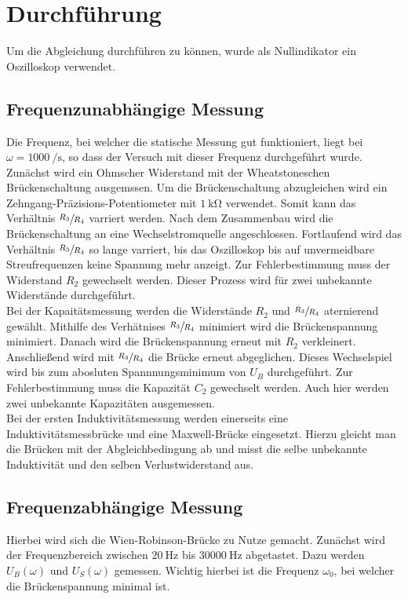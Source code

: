 \section{Durchführung}
\label{sec:Durchführung}
Um die Abgleichung durchführen zu können, wurde als Nullindikator ein Oszilloskop verwendet.
\subsection{Frequenzunabhängige Messung}
Die Frequenz, bei welcher die statische Messung gut funktioniert, liegt bei  $ \omega = \SI{1000}{\per\second}$, so dass der Versuch mit dieser Frequenz durchgeführt wurde.\\
Zunächst wird ein Ohmscher Widerstand mit der Wheatstoneschen Brückenschaltung ausgemssen. Um die Brückenschaltung abzugleichen wird ein 
Zehngang-Präzisions-Potentiometer  mit $\SI{1}{\kilo\ohm}$ verwendet. Somit kann das Verhältnis $\sfrac{R_3}{R_4}$ varriert werden.
Nach dem Zusammenbau wird die Brückenschaltung an eine Wechselstromquelle angeschlossen. Fortlaufend wird das Verhältnis 
$\sfrac{R_3}{R_4}$ so lange varriert, bis das Oszilloskop bis auf unvermeidbare 
Streufrequenzen keine Spannung mehr anzeigt. Zur Fehlerbestimmung muss der Widerstand $R_2$ gewechselt werden.
Dieser Prozess wird für zwei unbekannte Widerstände durchgeführt.\\
Bei der Kapaitätsmessung werden die Widerstände $R_2$ und $\sfrac{R_3}{R_4}$ aternierend gewählt. Mithilfe des Verhätnises 
$\sfrac{R_3}{R_4}$ minimiert wird die Brückenspannung minimiert. Danach wird die Brückenspannung erneut mit $R_2$ verkleinert. Anschließend 
wird mit $\sfrac{R_3}{R_4}$ die Brücke erneut abgeglichen. Dieses Wechselspiel wird bis zum abosluten Spannnungsminimum von $U_B$ durchgeführt.
Zur Fehlerbestimmung muss die Kapazität $C_2$ gewechselt werden. Auch hier werden zwei unbekannte Kapazitäten ausgemessen.\\
Bei der ersten Induktivitätsmessung werden einerseits eine Induktivitätsmessbrücke und eine Maxwell-Brücke eingesetzt. 
Hierzu gleicht man die Brücken mit der Abgleichbedingung ab und misst die selbe unbekannte Induktivität und den selben Verlustwiderstand aus.\\
\subsection{Frequenzabhängige Messung}
Hierbei wird sich die Wien-Robinson-Brücke zu Nutze gemacht. Zunächst wird der Frequenzbereich zwischen $\SI{20}{\hertz}$ bis $\SI{30000}{\hertz}$
abgetastet. Dazu werden $U_B\left(\omega\right)$ und $U_S\left(\omega\right)$ gemessen. Wichtig hierbei ist die Frequenz $\omega_0$, bei welcher die Brückenspannung
minimal ist.